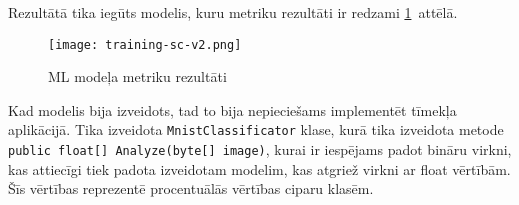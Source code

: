     Rezultātā tika iegūts modelis, kuru metriku rezultāti ir redzami \ref{ml:metrics}~attēlā.

    \begin{figure}[H]
        \centering
        \texttt{[image: training-sc-v2.png]}
        \caption{ML modeļa metriku rezultāti}
        \label{ml:metrics}
    \end{figure}

    Kad modelis bija izveidots, tad to bija nepieciešams implementēt tīmekļa aplikācijā. Tika izveidota
    \texttt{MnistClassificator} klase, kurā tika izveidota metode \texttt{public float[] Analyze(byte[] image)},
    kurai ir iespējams padot bināru virkni, kas attiecīgi tiek padota izveidotam modelim, kas atgriež
    virkni ar float vērtībām. Šīs vērtības reprezentē procentuālās vērtības ciparu klasēm.
